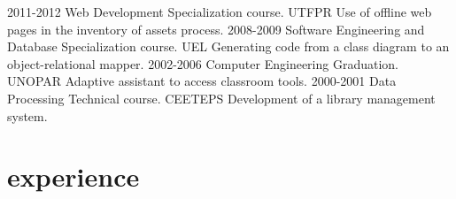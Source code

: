 \documentclass[]{twentysecondcv_en}
\begin{document}
\begin{twenty}
  \twentyitem
    {2011-2012}
    {Web Development Specialization course.}
    {UTFPR}
    {Use of offline web pages in the inventory of assets process.}
  \twentyitem
    {2008-2009}
    {Software Engineering and Database Specialization course.}
    {UEL}
    {Generating code from a class diagram to an object-relational mapper.}
  \twentyitem
    {2002-2006}
    {Computer Engineering Graduation.}
    {UNOPAR}
    {Adaptive assistant to access classroom tools.}
  \twentyitem
    {2000-2001}
    {Data Processing Technical course.}
    {CEETEPS}
    {Development of a library management system.}
\end{twenty}









\section{experience}
\end{document}
